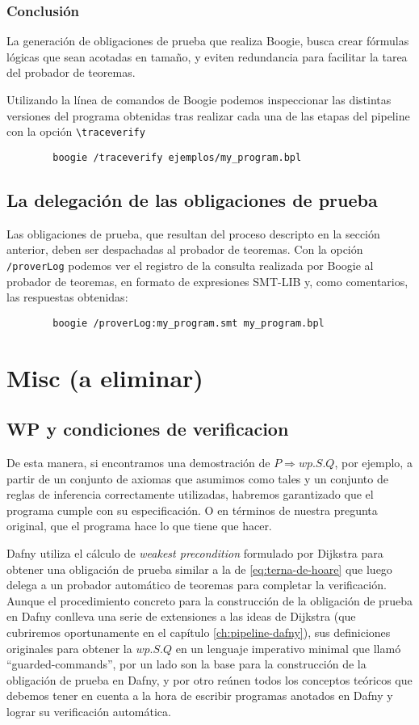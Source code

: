 \documentclass[12pt, a4paper, openany, fleqn]{book}
\begin{document}
    \subsection*{Conclusión}

    La generación de obligaciones de prueba que realiza Boogie, busca crear fórmulas lógicas que sean acotadas en tamaño, y eviten redundancia para facilitar la tarea del probador de teoremas.
  
    Utilizando la línea de comandos de Boogie podemos inspeccionar las distintas versiones del programa obtenidas tras realizar cada una de las etapas del pipeline con la opción \verb|\traceverify|
    \begin{verbatim}
        boogie /traceverify ejemplos/my_program.bpl
    \end{verbatim}

    \section{La delegación de las obligaciones de prueba}
    Las obligaciones de prueba, que resultan del proceso descripto en la sección anterior, deben ser despachadas al probador de teoremas.
    Con la opción \verb|/proverLog| podemos ver el registro de la consulta realizada por Boogie al probador de teoremas, en formato de expresiones SMT-LIB y, como comentarios, las respuestas obtenidas:
    \begin{verbatim}
        boogie /proverLog:my_program.smt my_program.bpl
    \end{verbatim}

    \chapter{Misc (a eliminar)}

    \section{WP y condiciones de verificacion}
    De esta manera, si encontramos una demostración de $P \Rightarrow wp.S.Q$, por ejemplo, a partir de un conjunto de axiomas que asumimos como tales y un conjunto de reglas de inferencia correctamente utilizadas, habremos garantizado que el programa cumple con su especificación. O en términos de nuestra pregunta original, que el programa hace lo que tiene que hacer.

    Dafny utiliza el cálculo de \textit{weakest precondition} formulado por Dijkstra para obtener una obligación de prueba similar a la de \ref{eq:terna-de-hoare} que luego delega a un probador automático de teoremas para completar la verificación.
    Aunque el procedimiento concreto para la construcción de la obligación de prueba en Dafny conlleva una serie de extensiones a las ideas de Dijkstra (que cubriremos oportunamente en el capítulo \ref{ch:pipeline-dafny}), sus definiciones originales para obtener la $wp.S.Q$ en un lenguaje imperativo minimal que llamó ``guarded-commands''\cite{EWD:EWD418}, por un lado son la base para la construcción de la obligación de prueba en Dafny, y por otro reúnen todos los conceptos teóricos que debemos tener en cuenta a la hora de escribir programas anotados en Dafny y lograr su verificación automática.
\end{document}
